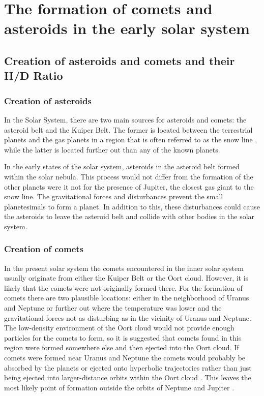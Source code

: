 \section{The formation of comets and asteroids in the early solar system}
\subsection{Creation of asteroids and comets and their H/D Ratio}
\subsubsection{Creation of asteroids}
In the Solar System, there are two main sources for asteroids and comets: the asteroid belt and the Kuiper Belt. The former is located between the terrestrial planets and the gas planets in a region that is often referred to as the snow line \cite{asteroid_belts}, while the latter is located further out than any of the known planets.

In the early states of the solar system, asteroids in the asteroid belt formed within the solar nebula. This process would not differ from the formation of the other planets were it not for the presence of Jupiter, the closest gas giant to the snow line. The gravitational forces and disturbances prevent the small planetesimals to form a planet. In addition to this, these disturbances could cause the asteroids to leave the asteroid belt and collide with other bodies in the solar system. \cite{asteroid_belts}

\subsubsection{Creation of comets}
In the present solar system the comets encountered in the inner solar system usually originate from either the Kuiper Belt or the Oort cloud. However, it is likely that the comets were not originally formed there.
For the formation of comets there are two plausible locations: either in the neighborhood of Uranus and Neptune or further out where the temperature was lower and the gravitational forces not as disturbing as in the vicinity of Uranus and Neptune. The low-density environment of the Oort cloud would not provide enough particles for the comets to form, so it is suggested that comets found in this region were formed somewhere else and then ejected into the Oort cloud.
If comets were formed near Uranus and Neptune the comets would probably be absorbed by the planets or ejected onto hyperbolic trajectories rather than just being ejected into larger-distance orbits within the Oort cloud \cite{comets_radiation_pressure}. This leaves the most likely point of formation outside the orbits of Neptune and Jupiter \cite{comets_origin}.



